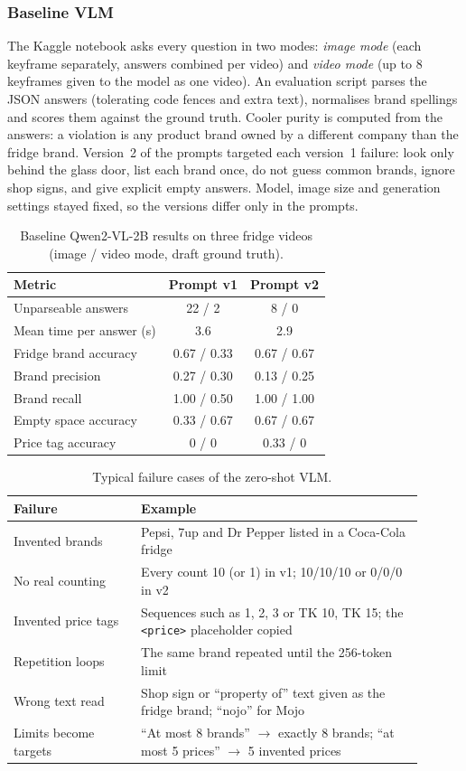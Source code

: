 \subsubsection{Baseline VLM}\label{sec:r3-vlm}
The Kaggle notebook asks every question in two modes: \emph{image mode} (each keyframe separately,
answers combined per video) and \emph{video mode} (up to 8 keyframes given to the model as one
video). An evaluation script parses the JSON answers (tolerating code fences and extra text),
normalises brand spellings and scores them against the ground truth. Cooler purity is computed
from the answers: a violation is any product brand owned by a different company than the fridge
brand. Version~2 of the prompts targeted each version~1 failure: look only behind the glass door,
list each brand once, do not guess common brands, ignore shop signs, and give explicit empty
answers. Model, image size and generation settings stayed fixed, so the versions differ only in
the prompts.

\begin{table}[!t]
\centering
\caption{Baseline Qwen2-VL-2B results on three fridge videos (image / video mode, draft ground truth).}
\label{tab:r3-results}
\begin{tabular}{lcc}
\hline
Metric & Prompt v1 & Prompt v2 \\
\hline
Unparseable answers & 22 / 2 & 8 / 0 \\
Mean time per answer (s) & 3.6 & 2.9 \\
Fridge brand accuracy & 0.67 / 0.33 & 0.67 / 0.67 \\
Brand precision & 0.27 / 0.30 & 0.13 / 0.25 \\
Brand recall & 1.00 / 0.50 & 1.00 / 1.00 \\
Empty space accuracy & 0.33 / 0.67 & 0.67 / 0.67 \\
Price tag accuracy & 0 / 0 & 0.33 / 0 \\
\hline
\end{tabular}
\end{table}

\begin{table}[!t]
\centering
\caption{Typical failure cases of the zero-shot VLM.}
\label{tab:r3-failures}
\begin{tabular}{p{0.28\linewidth}p{0.62\linewidth}}
\hline
Failure & Example \\
\hline
Invented brands & Pepsi, 7up and Dr Pepper listed in a Coca-Cola fridge \\
No real counting & Every count 10 (or 1) in v1; 10/10/10 or 0/0/0 in v2 \\
Invented price tags & Sequences such as 1, 2, 3 or TK 10, TK 15; the \texttt{<price>} placeholder copied \\
Repetition loops & The same brand repeated until the 256-token limit \\
Wrong text read & Shop sign or ``property of'' text given as the fridge brand; ``nojo'' for Mojo \\
Limits become targets & ``At most 8 brands'' $\rightarrow$ exactly 8 brands; ``at most 5 prices'' $\rightarrow$ 5 invented prices \\
\hline
\end{tabular}
\end{table}

